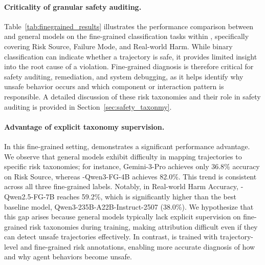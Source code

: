 \paragraph{Criticality of granular safety auditing.}
Table~\ref{tab:finegrained_results} illustrates the performance comparison between \toolAG{} and general models on the fine-grained classification tasks within \toolBench{}, specifically covering Risk Source, Failure Mode, and Real-world Harm. While binary classification can indicate whether a trajectory is safe, it provides limited insight into the root cause of a violation. Fine-grained diagnosis is therefore critical for safety auditing, remediation, and system debugging, as it helps identify why unsafe behavior occurs and which component or interaction pattern is responsible. A detailed discussion of these risk taxonomies and their role in safety auditing is provided in Section~\ref{sec:safety_taxonmy}.

\paragraph{Advantage of explicit taxonomy supervision.}
In this fine-grained setting, \toolAG{} demonstrates a significant performance advantage. We observe that general models exhibit difficulty in mapping trajectories to specific risk taxonomies; for instance, Gemini-3-Pro achieves only 36.8\% accuracy on Risk Source, whereas \toolAG{}-Qwen3-FG-4B achieves 82.0\%. This trend is consistent across all three fine-grained labels. Notably, in Real-world Harm Accuracy, \toolAG{}-Qwen2.5-FG-7B reaches 59.2\%, which is significantly higher than the best baseline model, Qwen3-235B-A22B-Instruct-2507 (38.0\%).  We hypothesize that this gap arises because general models typically lack explicit supervision on fine-grained risk taxonomies during training, making attribution difficult even if they can detect unsafe trajectories effectively. In contrast, \toolAG{} is trained with trajectory-level and fine-grained risk annotations, enabling more accurate diagnosis of how and why agent behaviors become unsafe.
